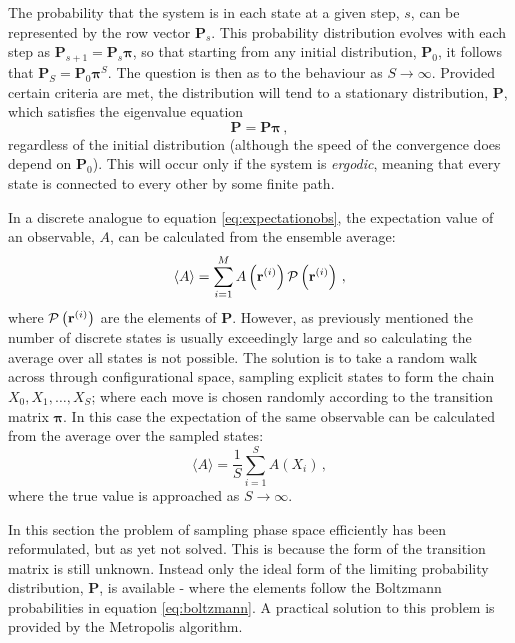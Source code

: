The probability that the system is in each state at a given step, $s$, can be represented by the row vector $\mathbf{P}_s$.
This probability distribution evolves with each step as $\mathbf{P}_{s+1}=\mathbf{P}_{s}\bm{\pi}$, so that starting from any initial distribution, $\mathbf{P}_0$, it follows that $\mathbf{P}_S=\mathbf{P}_0\bm{\pi}^S$. 
The question is then as to the behaviour as $S\rightarrow \infty$.
Provided certain criteria are met, the distribution will tend to a stationary distribution, $\mathbf{P}$, which satisfies the eigenvalue equation 
\begin{equation}
	\mathbf{P} = \mathbf{P}\bm{\pi}\,, \label{eq:mcmceig}
\end{equation}
regardless of the initial distribution (although the speed of the convergence does depend on $\mathbf{P}_0$).
This will occur only if the system is \textit{ergodic}, meaning that every state is connected to every other by some finite path.

In a discrete analogue to equation \eqref{eq:expectationobs}, the expectation value of an observable, $A$, can be calculated from the ensemble average:
\begin{equation}
	\langle A \rangle = \sum_{i=1}^{M} A\left(\mathbf{r}^{\left(i\right)}\right)\mathcal{P}\left(\mathbf{r}^{\left(i\right)}\right)\,,
\end{equation}
where $\mathcal{P}\left(\mathbf{r}^{\left(i\right)}\right)$ are the elements of $\mathbf{P}$.
However, as previously mentioned the number of discrete states is usually exceedingly large and so calculating the average over all states is not possible.
The solution is to take a random walk across through configurational space, sampling explicit states to form the chain $X_0,X_1,\dots,X_S$; where each move is chosen randomly according to the transition matrix $\bm{\pi}$.
In this case the expectation of the same observable can be calculated from the average over the sampled states:
\begin{equation}
	\langle A \rangle = \frac{1}{S}\sum_{i=1}^{S} A\left(X_i\right)\,,
\end{equation}
where the true value is approached as $S\rightarrow \infty$.

In this section the problem of sampling phase space efficiently has been reformulated, but as yet not solved. 
This is because the form of the transition matrix is still unknown.
Instead only the ideal form of the limiting probability distribution, $\mathbf{P}$, is available \-- where the elements follow the Boltzmann probabilities in equation \eqref{eq:boltzmann}.
A practical solution to this problem is provided by the Metropolis algorithm.

